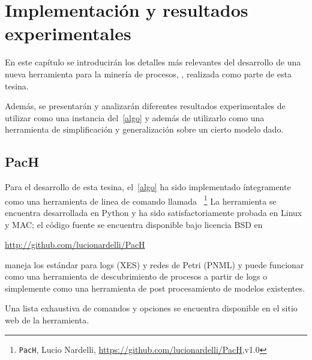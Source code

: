 \chapter[Implementación y resultados experimentales ]{Implementación y resultados experimentales}

En este capítulo se introducirán los detalles más relevantes del desarrollo de una nueva
herramienta para la minería de procesos, \pachtool, realizada como parte de esta tesina. 

Además, se presentarán y analizarán diferentes resultados experimentales 
de utilizar \pachtool como una instancia del~\autoref{algo} y además
de utilizarlo como una herramienta de
simplificación y generalización sobre un cierto modelo dado. 

\section{PacH}
\label{sec:4.pach}

Para el desarrollo de esta tesina, el~\autoref{algo} ha sido implementado íntegramente 
como una herramienta de linea de comando llamada \pachtool~\footnote{\texttt{PacH}, Lucio Nardelli, \url{https://github.com/lucionardelli/PacH},v1.0}
La herramienta se encuentra desarrollada en Python y ha sido satisfactoriamente probada en Linux y MAC;
el código fuente se encuentra disponible bajo licencia BSD en
\begin{center}\url{http://github.com/lucionardelli/PacH}\end{center}

\pachtool maneja los estándar para logs (XES) y redes de Petri (PNML) y puede funcionar como 
una herramienta de descubrimiento de procesos a partir de logs o simplemente como una herramienta 
de post procesamiento de modelos existentes.

Una lista exhaustiva de comandos y opciones se encuentra disponible en el sitio web de la herramienta.

%

